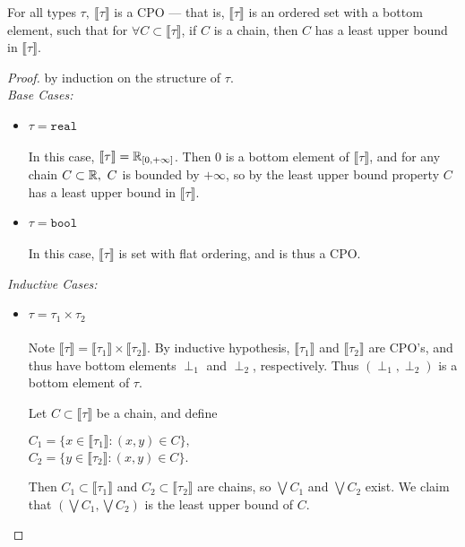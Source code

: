 \begin{thm}
For all types $\tau, \ \llbracket \tau \rrbracket$ is a CPO --- that is, $\llbracket \tau \rrbracket$ is an ordered 
set with a bottom element, such that for $\forall C \subset \llbracket \tau \rrbracket$, if  $C$ is a chain, then $C$ has a least 
upper bound in $\llbracket \tau \rrbracket$. \\
\end{thm}
\begin{proof}
by induction on the structure of $\tau$. \\
\emph{Base Cases: }
\begin{itemize}
\item $\tau = \texttt{real}$ \\ \\
In this case, $\llbracket \tau \rrbracket = \mathbb{R}_{[0,+\infty]}$. Then $0$ is a bottom element of $\llbracket \tau \rrbracket$, and for 
any chain $C \subset \mathbb{R}, \ C$ is bounded by $+\infty$, so by the least upper bound property $C$ has a least upper bound in 
$\llbracket \tau \rrbracket$.
\item $\tau = \texttt{bool}$ \\ \\
In this case, $\llbracket \tau \rrbracket$ is set with flat ordering, and is thus a CPO. \\ 
\end{itemize}
\emph{Inductive Cases: }
\begin{itemize}
\item $\tau = \tau_1 \times \tau_2$ \\ \\
Note $\llbracket \tau \rrbracket = \llbracket \tau_1 \rrbracket \times \llbracket \tau_2 \rrbracket$. By inductive hypothesis,
$\llbracket \tau_1 \rrbracket$ and $\llbracket \tau_2 \rrbracket$ are CPO's, and thus have bottom elements $\perp_1$ and $
\perp_2$, respectively. Thus $(\perp_1, \perp_2)$ is a bottom element of $\tau$. 

Let $C \subset \llbracket \tau \rrbracket$ be a
chain, and define
\begin{center}
$C_1 = \{x \in \llbracket \tau_1 \rrbracket : (x,y) \in C\},$ \\
$C_2 = \{ y \in \llbracket \tau_2 \rrbracket: (x,y) \in C\}$. \\ 
\end{center}
Then $C_1 \subset \llbracket \tau_1 \rrbracket$ and $C_2 \subset \llbracket \tau_2 \rrbracket$ are chains, so $\bigvee C_1$
and $\bigvee C_2$ exist. We claim that $(\bigvee C_1, \bigvee C_2)$ is the least upper bound of $C$. 


\end{itemize}
\end{proof}
